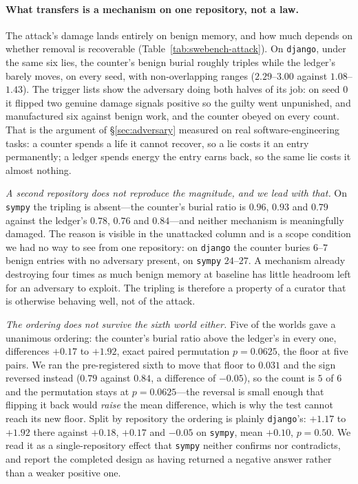 \paragraph{What transfers is a mechanism on one repository, not a law.}
The attack's damage lands entirely on benign memory, and how much
depends on whether removal is recoverable (Table~\ref{tab:swebench-attack}).
On \texttt{django}, under the same six lies, the counter's benign burial
roughly triples while the ledger's barely moves, on every seed, with
non-overlapping ranges ($2.29$--$3.00$ against $1.08$--$1.43$). The
trigger lists show the adversary doing both halves of its job: on seed 0
it flipped two genuine damage signals positive so the guilty went
unpunished, and manufactured six against benign work, and the counter
obeyed on every count. That is the argument of \S\ref{sec:adversary}
measured on real software-engineering tasks: a counter spends a life it
cannot recover, so a lie costs it an entry permanently; a ledger spends
energy the entry earns back, so the same lie costs it almost nothing.

\emph{A second repository does not reproduce the magnitude, and we lead
with that.} On \texttt{sympy} the tripling is absent---the counter's
burial ratio is $0.96$, $0.93$ and $0.79$ against the ledger's $0.78$,
$0.76$ and $0.84$---and neither mechanism is meaningfully damaged. The
reason is visible in the unattacked column and is a scope condition we
had no way to see from one repository: on \texttt{django} the counter
buries $6$--$7$ benign entries with no adversary present, on
\texttt{sympy} $24$--$27$. A mechanism already destroying four times as
much benign memory at baseline has little headroom left for an adversary
to exploit. The tripling is therefore a property of a curator that is
otherwise behaving well, not of the attack.

\emph{The ordering does not survive the sixth world either.} Five of the
worlds gave a unanimous ordering: the counter's burial ratio above the
ledger's in every one, differences $+0.17$ to $+1.92$, exact paired
permutation $p = 0.0625$, the floor at five pairs. We ran the
pre-registered sixth to move that floor to $0.031$ and the sign reversed
instead ($0.79$ against $0.84$, a difference of $-0.05$), so the count is
$5$ of $6$ and the permutation stays at $p = 0.0625$---the reversal is
small enough that flipping it back would \emph{raise} the mean
difference, which is why the test cannot reach its new floor. Split by
repository the ordering is plainly \texttt{django}'s: $+1.17$ to $+1.92$
there against $+0.18$, $+0.17$ and $-0.05$ on \texttt{sympy}, mean
$+0.10$, $p = 0.50$. We read it as a single-repository effect that
\texttt{sympy} neither confirms nor contradicts, and report the
completed design as having returned a negative answer rather than a
weaker positive one.


